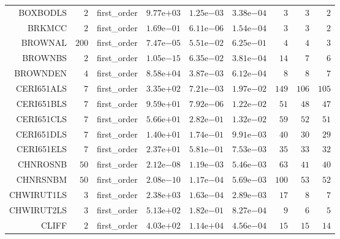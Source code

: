 \begin{longtable}{rrrrrrrrr}
BOXBODLS & \(     2\) & first\_order & \( 9.77\)e\(+03\) & \( 1.25\)e\(-03\) & \( 3.38\)e\(-04\) & \(     3\) & \(     3\) & \(     2\) \\
BRKMCC & \(     2\) & first\_order & \( 1.69\)e\(-01\) & \( 6.11\)e\(-06\) & \( 1.54\)e\(-04\) & \(     3\) & \(     3\) & \(     2\) \\
BROWNAL & \(   200\) & first\_order & \( 7.47\)e\(-05\) & \( 5.51\)e\(-02\) & \( 6.25\)e\(-01\) & \(     4\) & \(     4\) & \(     3\) \\
BROWNBS & \(     2\) & first\_order & \( 1.05\)e\(-15\) & \( 6.35\)e\(-02\) & \( 3.81\)e\(-04\) & \(    14\) & \(     7\) & \(     6\) \\
BROWNDEN & \(     4\) & first\_order & \( 8.58\)e\(+04\) & \( 3.87\)e\(-03\) & \( 6.12\)e\(-04\) & \(     8\) & \(     8\) & \(     7\) \\
CERI651ALS & \(     7\) & first\_order & \( 3.35\)e\(+02\) & \( 7.21\)e\(-03\) & \( 1.97\)e\(-02\) & \(   149\) & \(   106\) & \(   105\) \\
CERI651BLS & \(     7\) & first\_order & \( 9.59\)e\(+01\) & \( 7.92\)e\(-06\) & \( 1.22\)e\(-02\) & \(    51\) & \(    48\) & \(    47\) \\
CERI651CLS & \(     7\) & first\_order & \( 5.66\)e\(+01\) & \( 2.82\)e\(-01\) & \( 1.32\)e\(-02\) & \(    59\) & \(    52\) & \(    51\) \\
CERI651DLS & \(     7\) & first\_order & \( 1.40\)e\(+01\) & \( 1.74\)e\(-01\) & \( 9.91\)e\(-03\) & \(    40\) & \(    30\) & \(    29\) \\
CERI651ELS & \(     7\) & first\_order & \( 2.37\)e\(+01\) & \( 5.81\)e\(-01\) & \( 7.53\)e\(-03\) & \(    35\) & \(    33\) & \(    32\) \\
CHNROSNB & \(    50\) & first\_order & \( 2.12\)e\(-08\) & \( 1.19\)e\(-03\) & \( 5.46\)e\(-03\) & \(    63\) & \(    41\) & \(    40\) \\
CHNRSNBM & \(    50\) & first\_order & \( 2.08\)e\(-10\) & \( 1.17\)e\(-04\) & \( 5.69\)e\(-03\) & \(   100\) & \(    53\) & \(    52\) \\
CHWIRUT1LS & \(     3\) & first\_order & \( 2.38\)e\(+03\) & \( 1.63\)e\(-04\) & \( 2.89\)e\(-03\) & \(    17\) & \(     8\) & \(     7\) \\
CHWIRUT2LS & \(     3\) & first\_order & \( 5.13\)e\(+02\) & \( 1.82\)e\(-01\) & \( 8.27\)e\(-04\) & \(     9\) & \(     6\) & \(     5\) \\
CLIFF & \(     2\) & first\_order & \( 4.03\)e\(+02\) & \( 1.14\)e\(+04\) & \( 4.56\)e\(-04\) & \(    15\) & \(    15\) & \(    14\) \\

\end{longtable}

